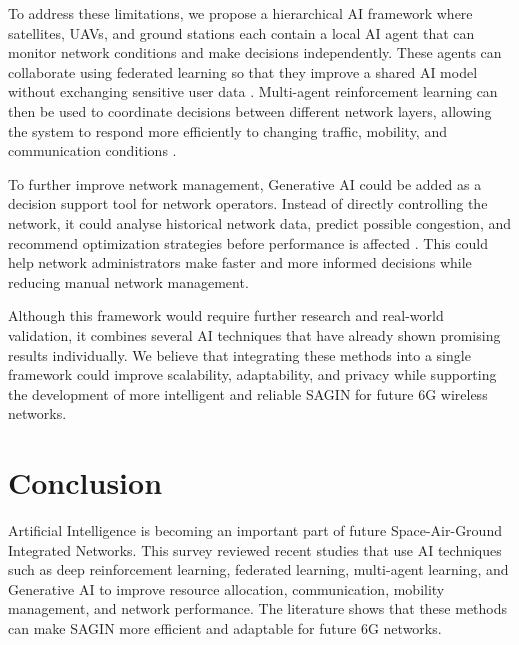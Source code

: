 \documentclass[letterpaper]{article} %
\begin{document}
To address these limitations, we propose a hierarchical AI framework where satellites, UAVs, and ground stations each contain a local AI agent that can monitor network conditions and make decisions independently. These agents can collaborate using federated learning so that they improve a shared AI model without exchanging sensitive user data \citep{yang2024dfedsat,li2026adaptive}. Multi-agent reinforcement learning can then be used to coordinate decisions between different network layers, allowing the system to respond more efficiently to changing traffic, mobility, and communication conditions \citep{kim2024quantum,zhang2023multiagent}.

To further improve network management, Generative AI could be added as a decision support tool for network operators. Instead of directly controlling the network, it could analyse historical network data, predict possible congestion, and recommend optimization strategies before performance is affected \citep{zhang2024generative}. This could help network administrators make faster and more informed decisions while reducing manual network management.

Although this framework would require further research and real-world validation, it combines several AI techniques that have already shown promising results individually. We believe that integrating these methods into a single framework could improve scalability, adaptability, and privacy while supporting the development of more intelligent and reliable SAGIN for future 6G wireless networks.


\section{Conclusion}
Artificial Intelligence is becoming an important part of future Space-Air-Ground Integrated Networks. This survey reviewed recent studies that use AI techniques such as deep reinforcement learning, federated learning, multi-agent learning, and Generative AI to improve resource allocation, communication, mobility management, and network performance. The literature shows that these methods can make SAGIN more efficient and adaptable for future 6G networks.
\end{document}
